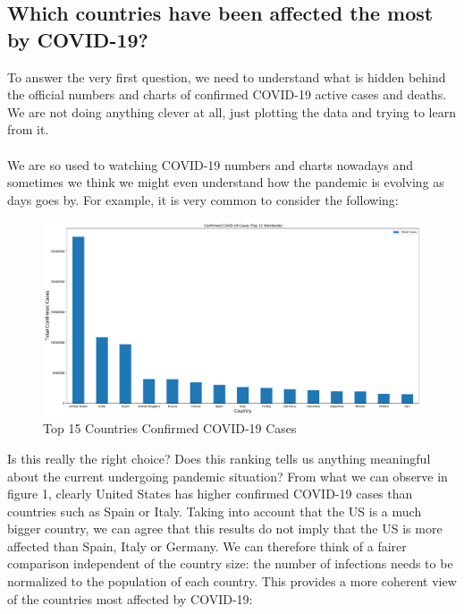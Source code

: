 \documentclass[11pt,a4paper]{article}
\begin{document}
\subsection{Which countries have been affected the most by COVID-19?}
To answer the very first question, we need to understand what is hidden behind
the official numbers and charts of confirmed COVID-19 active cases and deaths.
We are not doing anything clever at all, just plotting the data and trying to
learn from it.\\
\\
We are so used to watching COVID-19 numbers and charts nowadays and sometimes we
think we might even understand how the pandemic is evolving as days goes by. For
example, it is very common to consider the following:
\begin{figure}[H]
    \begin{center}
        \hspace*{-0.2cm}
        \includegraphics[scale=0.32]{img/total-cases.pdf}
    \end{center}
    \vspace{-0.2cm}
    \caption{Top 15 Countries Confirmed COVID-19 Cases}
\end{figure}
\noindent
Is this really the right choice? Does this ranking tells us anything meaningful
about the current undergoing pandemic situation? From what we can observe in
figure 1, clearly United States has higher confirmed COVID-19 cases than
countries such as Spain or Italy. Taking into account that the US is a much
bigger country, we can agree that this results do not imply that the US is more
affected than Spain, Italy or Germany. We can therefore think of a fairer
comparison independent of the country size: the number of infections needs to be
normalized to the population of each country. This provides a more coherent view
of the countries most affected by COVID-19:
\end{document}
